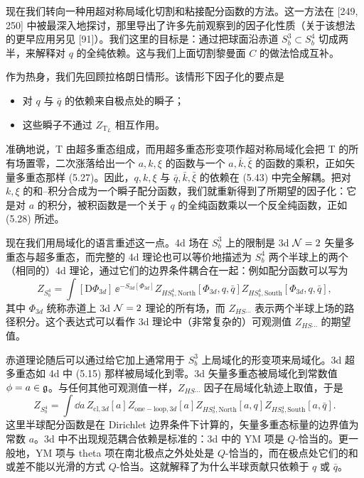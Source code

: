  现在我们转向一种用超对称局域化切割和粘接配分函数的方法。这一方法在 [249, 250] 中被最深入地探讨，那里导出了许多先前观察到的因子化性质（关于该想法的更早应用另见 [91]）。我们这里的目标是：通过把球面沿赤道 $S^3_b\subset S^4_b$ 切成两半，来解释对 $q$ 的全纯依赖。这与我们上面切割黎曼面 $C$ 的做法恰成互补。

作为热身，我们先回顾拉格朗日情形。该情形下因子化的要点是
\begin{itemize}[leftmargin=1.4em,itemsep=2pt,topsep=2pt]
\item 对 $q$ 与 $\bar q$ 的依赖来自极点处的瞬子；
\item 这些瞬子不通过 $Z_{\mathrm{T}_L}$ 相互作用。
\end{itemize}

准确地说，T 由超多重态组成，而用超多重态形变项作超对称局域化会把 T 的所有场置零，二次涨落给出一个 $a,k,\xi$ 的函数与一个 $a,\bar k,\bar\xi$ 的函数的乘积，正如矢量多重态那样 (5.27)。因此，$q,k,\xi$ 与 $\bar q,\bar k,\bar\xi$ 的依赖在 (5.43) 中完全解耦。把对 $k,\xi$ 的和--积分合成为一个瞬子配分函数，我们就重新得到了所期望的因子化：它是对 $a$ 的积分，被积函数是一个关于 $q$ 的全纯函数乘以一个反全纯函数，正如 (5.28) 所述。

现在我们用局域化的语言重述这一点。4d 场在 $S^3_b$ 上的限制是 3d $\mathcal{N}=2$ 矢量多重态与超多重态，而完整的 4d 理论也可以等价地描述为 $S^4_b$ 两个半球上的两个（相同的）4d 理论，通过它们的边界条件耦合在一起：例如配分函数可以写为
\begin{equation}
  Z_{S^4_b} = \int[\mathrm{D}\Phi_{3d}]\,\ee^{-S_{3d}[\Phi_{3d}]}Z_{H S^4_b,\mathrm{North}}[\Phi_{3d},q,\bar q]Z_{H S^4_b,\mathrm{South}}[\Phi_{3d},q,\bar q],
  \tag{5.44}
\end{equation}
其中 $\Phi_{3d}$ 统称赤道上 3d $\mathcal{N}=2$ 理论的所有场，而 $Z_{H S\cdots}$ 表示两个半球上场的路径积分。这个表达式可以看作 3d 理论中（非常复杂的）可观测值 $Z_{H S\cdots}$ 的期望值。

赤道理论随后可以通过给它加上通常用于 $S^3_b$ 上局域化的形变项来局域化。3d 超多重态如 4d 中 (5.15) 那样被局域化到零。3d 矢量多重态被局域化到常数值 $\phi=a\in\mathfrak{g}$。与任何其他可观测值一样，$Z_{H S\cdots}$ 因子在局域化轨迹上取值，于是
\begin{equation}
  Z_{S^4_b} = \int \dd a\, Z_{\mathrm{cl},3d}[a]Z_{\mathrm{one-loop},3d}[a]Z_{H S^4_b,\mathrm{North}}[a,q]Z_{H S^4_b,\mathrm{South}}[a,\bar q].
  \tag{5.45}
\end{equation}
这里半球配分函数是在 Dirichlet 边界条件下计算的，矢量多重态标量的边界值为常数 $a$。3d 中不出现规范耦合依赖是标准的：3d 中的 YM 项是 $Q$-恰当的。更一般地，YM 项与 theta 项在南北极点之外处处是 $Q$-恰当的，而在极点处它们的和或差不能以光滑的方式 $Q$-恰当。这就解释了为什么半球贡献只依赖于 $q$ 或 $\bar q$。


